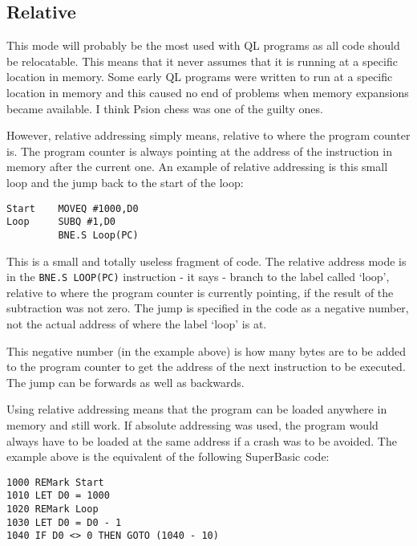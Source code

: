 \subsection{Relative}\address{Relative}

This mode will probably be the most used with QL programs as all
      code should be relocatable. This means that it never assumes that it is
      running at a specific location in memory. Some early QL programs were
      written to run at a specific location in memory and this caused no end
      of problems when memory expansions became available. I think Psion chess
      was one of the guilty ones.

However, relative addressing simply means, relative to where the
      program counter is. The program counter is always pointing at the
      address of the instruction in memory after the current one. An example
      of relative addressing is this small loop and the jump back to the start
      of the loop:

\begin{lstlisting}[firstnumber=1,]
Start    MOVEQ #1000,D0
Loop     SUBQ #1,D0
         BNE.S Loop(PC)  
\end{lstlisting}

This is a small and totally useless fragment of code. The relative
      address mode is in the \lstinline{BNE.S LOOP(PC)} instruction -{} it says -{} branch to
      the label called `loop', relative to where the program counter is
      currently pointing, if the result of the subtraction was not zero. The
      jump is specified in the code as a negative number, not the actual
      address of where the label `loop' is at.

This negative number (in the example above) is how many bytes are
      to be added to the program counter to get the address of the next
      instruction to be executed. The jump can be forwards as well as
      backwards.

Using relative addressing means that the program can be loaded
      anywhere in memory and still work. If absolute addressing was used, the
      program would always have to be loaded at the same address if a crash
      was to be avoided. The example above is the equivalent of the following
      SuperBasic code:

\begin{lstlisting}[firstnumber=1,language={[Visual]Basic}]
1000 REMark Start
1010 LET D0 = 1000
1020 REMark Loop
1030 LET D0 = D0 - 1
1040 IF D0 <> 0 THEN GOTO (1040 - 10)
\end{lstlisting}

